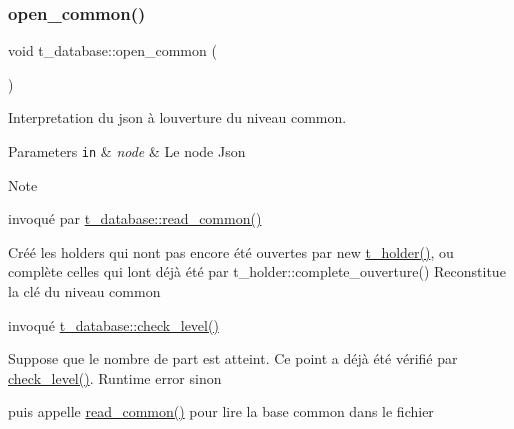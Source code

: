 \subsubsection{\texorpdfstring{open\+\_\+common()}{open\_common()}}
{\footnotesize\ttfamily void t\+\_\+database\+::open\+\_\+common (\begin{DoxyParamCaption}{ }\end{DoxyParamCaption})}



Interpretation du json à l\textquotesingle{}ouverture du niveau \textquotesingle{}common\textquotesingle{}. 


\begin{DoxyParams}[1]{Parameters}
\mbox{\tt in}  & {\em node} & Le node Json \\
\hline
\end{DoxyParams}
\begin{DoxyNote}{Note}

\begin{DoxyItemize}
\item invoqué par \hyperlink{classt__database_a63cf67dc2e635cec8d4ec4c023d0350a}{t\+\_\+database\+::read\+\_\+common()}
\item Créé les holders qui n\textquotesingle{}ont pas encore été ouvertes par new \hyperlink{classt__holder}{t\+\_\+holder()}, ou complète celles qui l\textquotesingle{}ont déjà été par t\+\_\+holder\+::complete\+\_\+ouverture() Reconstitue la clé du niveau common 
\end{DoxyItemize}


\begin{DoxyItemize}
\item invoqué \hyperlink{classt__database_aff1abd122b7ea2dedf36eff44d75f0ef}{t\+\_\+database\+::check\+\_\+level()}
\item Suppose que le nombre de part est atteint. Ce point a déjà été vérifié par \hyperlink{classt__database_aff1abd122b7ea2dedf36eff44d75f0ef}{check\+\_\+level()}. Runtime error sinon
\item puis appelle \hyperlink{classt__database_a63cf67dc2e635cec8d4ec4c023d0350a}{read\+\_\+common()} pour lire la base common dans le fichier 
\end{DoxyItemize}
\end{DoxyNote}
\mbox{\label{classt__database_ab0fd87c39625de20aa554a982fa00fa4}} 
